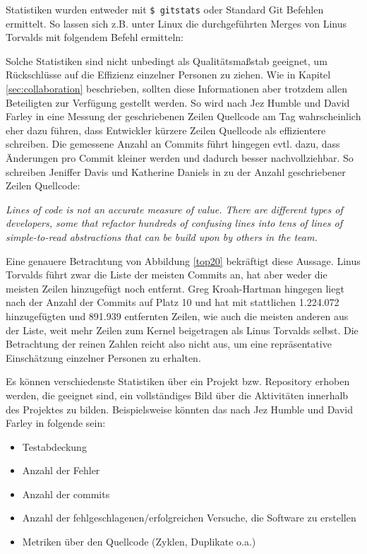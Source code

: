 Statistiken wurden entweder mit \texttt{\$ gitstats} \cite{link:gitstats} oder
Standard Git Befehlen ermittelt. So lassen sich z.B. unter Linux die
durchgeführten Merges von Linus Torvalds mit folgendem Befehl ermitteln:


Solche Statistiken sind nicht unbedingt als Qualitätsmaßstab geeignet, um
Rückschlüsse auf die Effizienz einzelner Personen zu ziehen. Wie in Kapitel
\ref{sec:collaboration} beschrieben, sollten diese Informationen aber trotzdem
allen Beteiligten zur Verfügung gestellt werden. So wird nach Jez Humble und
David Farley in \cite[S.~138]{cd} eine Messung der geschriebenen Zeilen
Quellcode am Tag wahrscheinlich eher dazu führen, dass Entwickler kürzere Zeilen
Quellcode als effizientere schreiben. Die gemessene Anzahl an Commits führt hingegen
evtl. dazu, dass Änderungen pro Commit kleiner werden und dadurch besser
nachvollziehbar. So schreiben Jeniffer Davis und Katherine Daniels in
\cite[S.~179]{effdo} zu der Anzahl geschriebener Zeilen Quellcode:
\begin{center}
\textit{\glqq{}Lines of code is not an accurate measure of value. There are
different types of developers, some that refactor hundreds of confusing lines
into tens of lines of simple-to-read abstractions that can be build upon by
others in the team.\grqq{}}
\end{center}

Eine genauere Betrachtung von Abbildung \ref{top20} bekräftigt diese Aussage.
Linus Torvalds führt zwar die Liste der meisten Commits an, hat aber weder die
meisten Zeilen hinzugefügt noch entfernt. Greg Kroah-Hartman hingegen liegt
nach der Anzahl der Commits auf Platz 10 und hat mit stattlichen 1.224.072
hinzugefügten und 891.939 entfernten Zeilen, wie auch die meisten anderen aus
der Liste, weit mehr Zeilen zum Kernel beigetragen als Linus Torvalds selbst.
Die Betrachtung der reinen Zahlen reicht also nicht aus, um eine repräsentative
Einschätzung einzelner Personen zu erhalten.

Es können verschiedenste Statistiken über ein Projekt bzw. Repository erhoben
werden, die geeignet sind, ein vollständiges Bild über die Aktivitäten
innerhalb des Projektes zu bilden. Beispielsweise könnten das nach Jez Humble
und David Farley in \cite[S.~138]{cd} folgende sein:

\begin{itemize}
\item Testabdeckung
\item Anzahl der Fehler
\item Anzahl der \glspl{commit}
\item Anzahl der fehlgeschlagenen/erfolgreichen Versuche, die Software zu erstellen
\item Metriken über den Quellcode (Zyklen, Duplikate o.a.)
\end{itemize}

